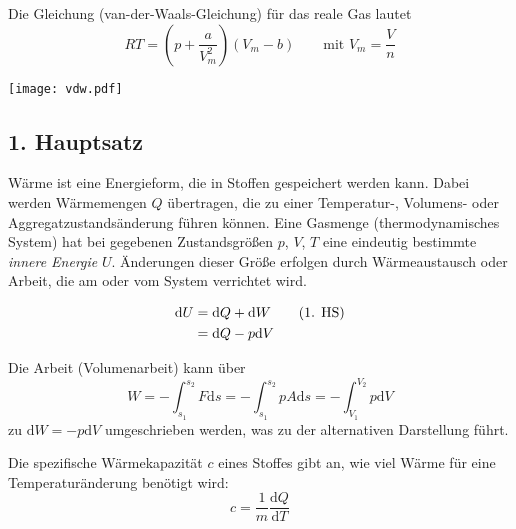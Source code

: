 \documentclass[a4paper]{scrartcl}
\begin{document}
Die Gleichung (van-der-Waals-Gleichung) für das reale Gas lautet
\begin{equation*}
  RT = \left( p + \frac{a}{V_m^2} \right) (V_m-b) \qquad \text{mit } V_m = \frac{V}{n}
\end{equation*}

\texttt{[image: vdw.pdf]}

\subsection{1. Hauptsatz}
Wärme ist eine Energieform, die in Stoffen gespeichert werden kann. Dabei werden Wärmemengen $Q$ übertragen, die zu einer Temperatur-, Volumens- oder Aggregatzustandsänderung führen können. 
Eine Gasmenge (thermodynamisches System) hat bei gegebenen Zustandsgrößen $p$, $V$, $T$ eine eindeutig bestimmte \emph{innere Energie} $U$. Änderungen dieser Größe erfolgen durch Wärmeaustausch oder Arbeit, die am oder vom System verrichtet wird.

\begin{align}
  \text{d}U & = \text{d}Q + \text{d}W  \tag{1. HS} \label{equ:1HS} \\
  & = \text{d}Q - p\text{d}V \notag
\end{align}

Die Arbeit (Volumenarbeit) kann über
\begin{equation*} 
  W = -\int_{s_1}^{s_2}F\text{d}s = -\int_{s_1}^{s_2}pA\text{d}s = -\int_{V_1}^{V_2}p\text{d}V
\end{equation*}
zu $\text{d}W = -p\text{d}V$ umgeschrieben werden, was zu der alternativen Darstellung führt.

Die spezifische Wärmekapazität $c$ eines Stoffes gibt an, wie viel Wärme für eine Temperaturänderung benötigt wird:
\begin{equation*}
  c = \frac{1}{m}\frac{\text{d}Q}{\text{d}T}
\end{equation*}
\end{document}

